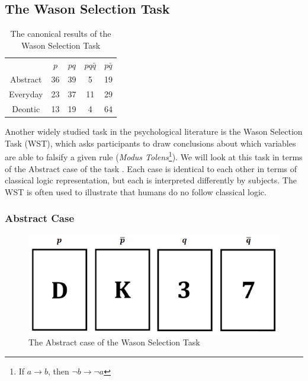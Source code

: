 \documentclass{article}
\begin{document}
\subsection{The Wason Selection Task} \label{ssec:wst}

\begin{table}
\begin{center}


\begin{tabular}{ c c c c c}
  & \textbf{$p$} & \textbf{$pq$} & \textbf{$pq\bar{q}$} & \textbf{$p\bar{q}$}\\ 
 Abstract & 36 & 39 & 5 & 19\\  
 Everyday & 23 & 37 & 11 & 29\\  
 Deontic & 13 & 19 & 4 & 64
\end{tabular}
\caption{The canonical results of the Wason Selection Task}
\label{tbl:can}
\end{center}
\end{table}


Another widely studied task in the psychological literature is the Wason Selection Task (WST), which asks participants to draw conclusions about which variables are able to falsify a given rule (\textit{Modus Tolens}\footnote{If $a\rightarrow b$, then $\lnot b \rightarrow \lnot a$}). We will look at this task in terms of the Abstract case of the task \citep{wason1968reasoning}. Each case is identical to each other in terms of classical logic representation, but each is interpreted differently by subjects. The WST is often used to illustrate that humans do no follow classical logic.

\subsubsection*{Abstract Case}

\begin{figure}
\begin{center}
\includegraphics[scale=0.5]{wasonAbstract}
\caption{The Abstract case of the Wason Selection Task}
\end{center}
\end{figure}
\end{document}
